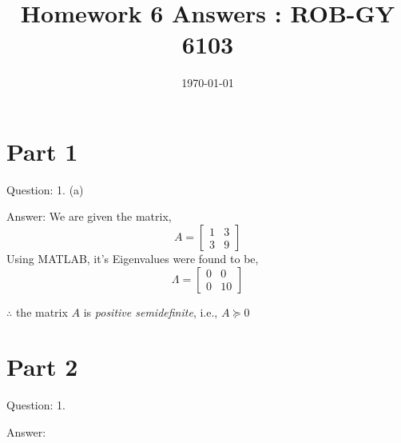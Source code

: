\documentclass[a4paper]{article}
\title{Homework 6 Answers : ROB-GY 6103}
\author{\myName}
\date{\today}
\newcommand{\myName}{\textbf{Shantanu Ghodgaonkar}\\\textit{Univ ID}: N11344563\\\textit{Net ID}: sng8399\\\textit{Ph.No.}: +1 (929) 922-0614}
\begin{document}
	
%	
	\section*{Part 1}
		\begin{qalist}			
			\item[Question: 1. (a)] \setcounter{equation}{0}
			\item[Answer:] We are given the matrix, 
				\begin{equation}
					A = \begin{bmatrix} 1 & 3 \\ 3 & 9 \end{bmatrix}
				\end{equation}
				Using MATLAB, it\rq{}s Eigenvalues were found to be, 
				\begin{equation}
					\Lambda = \begin{bmatrix} 0 & 0 \\ 0 & 10 \end{bmatrix}
				\end{equation}
				
				$\therefore$ the matrix $A$ is \emph{positive semidefinite}, i.e., $A \succcurlyeq 0$
		\end{qalist}
		
		
		
	\section*{Part 2}
		\begin{qalist}			
			\item[Question: 1.] \setcounter{equation}{0}
			\item[Answer:] 
		\end{qalist}
\end{document}
